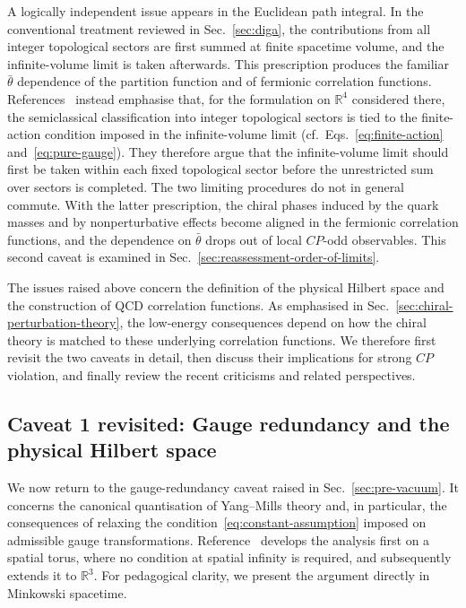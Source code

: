 \documentclass[review]{elsarticle}
\numberwithin{equation}{section}
\numberwithin{table}{section}
\numberwithin{figure}{section}
\begin{document}
A logically independent issue appears in the Euclidean path integral. In the conventional treatment reviewed in Sec.~\ref{sec:diga}, the contributions from all integer topological sectors are first summed at finite spacetime volume, and the infinite-volume limit is taken afterwards. This prescription produces the familiar $\bar\theta$ dependence of the partition function and of fermionic correlation functions. References~\cite{Ai:2020ptm,Ai:2024cnp} instead emphasise that, for the formulation on $\mathbb R^4$ considered there, the semiclassical classification into integer topological sectors is tied to the finite-action condition imposed in the infinite-volume limit (cf.~Eqs.~\eqref{eq:finite-action} and~\eqref{eq:pure-gauge}). They therefore argue that the infinite-volume limit should first be taken within each fixed topological sector before the unrestricted sum over sectors is completed. The two limiting procedures do not in general commute. With the latter prescription, the chiral phases induced by the quark masses and by nonperturbative effects become aligned in the fermionic correlation functions, and the dependence on $\bar{\theta}$ drops out of local $CP$-odd observables. This second caveat is examined in Sec.~\ref{sec:reassessment-order-of-limits}.

The issues raised above concern the definition of the physical Hilbert space and the construction of QCD correlation functions. As emphasised in Sec.~\ref{sec:chiral-perturbation-theory}, the low-energy consequences depend on how the chiral theory is matched to these underlying correlation functions. We therefore first revisit the two caveats in detail, then discuss their implications for strong $CP$ violation, and finally review the recent criticisms and related perspectives.

\subsection{Caveat 1 revisited: Gauge redundancy and the physical Hilbert space}
\label{sec:reassessment-physical-Hilbert-space}

We now return to the gauge-redundancy caveat raised in Sec.~\ref{sec:pre-vacuum}. It concerns the canonical quantisation of Yang--Mills theory and, in particular, the consequences of relaxing the condition~\eqref{eq:constant-assumption} imposed on admissible gauge transformations. Reference~\cite{Ai:2024vfa} develops the analysis first on a spatial torus, where no condition at spatial infinity is required, and subsequently extends it to $\mathbb R^3$. For pedagogical clarity, we present the argument directly in Minkowski spacetime.
\end{document}

